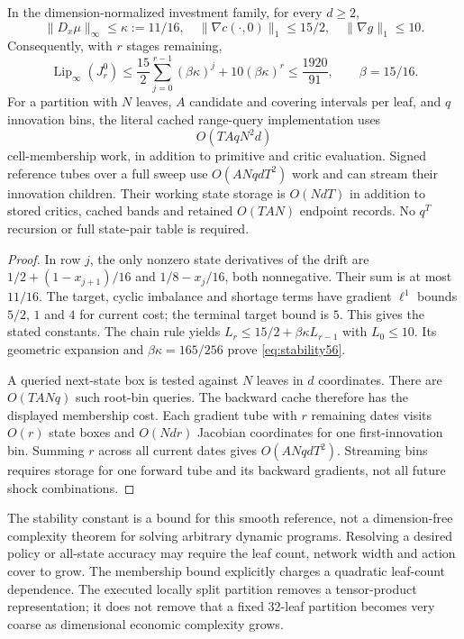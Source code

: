 \begin{proposition}\label{prop:work56}
In the dimension-normalized investment family, for every $d\ge2$,
\[
 \|D_x\mu\|_\infty\le\kappa:=11/16,
 \quad \|\nabla c(\cdot,0)\|_1\le15/2,
 \quad \|\nabla g\|_1\le10.
\]
Consequently, with $r$ stages remaining,
\begin{equation}\label{eq:stability56}
 \operatorname{Lip}_{\infty}(J^0_r)
 \le\frac{15}{2}\sum_{j=0}^{r-1}(\beta\kappa)^j
                 +10(\beta\kappa)^r
 \le\frac{1920}{91},\qquad \beta=15/16.
\end{equation}
For a partition with $N$ leaves, $A$ candidate and covering intervals per leaf, and $q$ innovation bins, the literal cached range-query implementation uses
\[
 O(TAqN^2d)
\]
cell-membership work, in addition to primitive and critic evaluation. Signed reference tubes over a full sweep use $O(ANqdT^2)$ work and can stream their innovation children. Their working state storage is $O(NdT)$ in addition to stored critics, cached bands and retained $O(TAN)$ endpoint records. No $q^T$ recursion or full state-pair table is required.
\end{proposition}
\begin{proof}
In row $j$, the only nonzero state derivatives of the drift are $1/2+(1-x_{j+1})/16$ and $1/8-x_j/16$, both nonnegative. Their sum is at most $11/16$. The target, cyclic imbalance and shortage terms have gradient $\ell^1$ bounds $5/2$, $1$ and $4$ for current cost; the terminal target bound is $5$. This gives the stated constants. The chain rule yields $L_r\le15/2+\beta\kappa L_{r-1}$ with $L_0\le10$. Its geometric expansion and $\beta\kappa=165/256$ prove \eqref{eq:stability56}.

A queried next-state box is tested against $N$ leaves in $d$ coordinates. There are $O(TANq)$ such root-bin queries. The backward cache therefore has the displayed membership cost. Each gradient tube with $r$ remaining dates visits $O(r)$ state boxes and $O(Ndr)$ Jacobian coordinates for one first-innovation bin. Summing $r$ across all current dates gives $O(ANqdT^2)$. Streaming bins requires storage for one forward tube and its backward gradients, not all future shock combinations.
\end{proof}

The stability constant is a bound for this smooth reference, not a dimension-free complexity theorem for solving arbitrary dynamic programs. Resolving a desired policy or all-state accuracy may require the leaf count, network width and action cover to grow. The membership bound explicitly charges a quadratic leaf-count dependence. The executed locally split partition removes a tensor-product representation; it does not remove that a fixed 32-leaf partition becomes very coarse as dimensional economic complexity grows.

